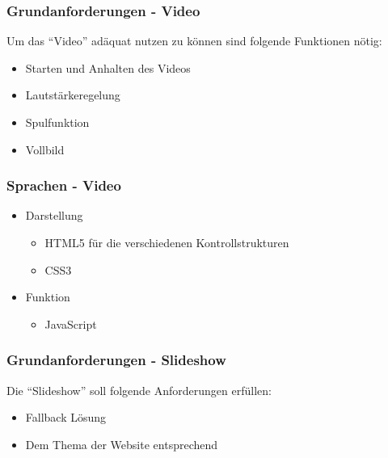 \begin{frame} %
  \frametitle{Grundanforderungen - Video} %

   Um das "`Video"' adäquat nutzen zu können sind folgende Funktionen nötig:
   \begin{itemize}
    \item Starten und Anhalten des Videos
    \item Lautstärkeregelung
    \item Spulfunktion
    \item Vollbild
   \end{itemize}

\end{frame}

\begin{frame} %
  \frametitle{Sprachen - Video} %

   \begin{itemize}
    \item Darstellung
    \begin{itemize}
     \item HTML5 für die verschiedenen Kontrollstrukturen
     \item CSS3
    \end{itemize}

	\item Funktion
	    \begin{itemize}
	     \item JavaScript
	    \end{itemize}
    
   \end{itemize}

\end{frame}

\begin{frame} %
  \frametitle{Grundanforderungen - Slideshow} %

   Die "`Slideshow"' soll folgende Anforderungen erfüllen:
   \begin{itemize}
    \item Fallback Lösung
    \item Dem Thema der Website entsprechend
    
   \end{itemize}

\end{frame}

